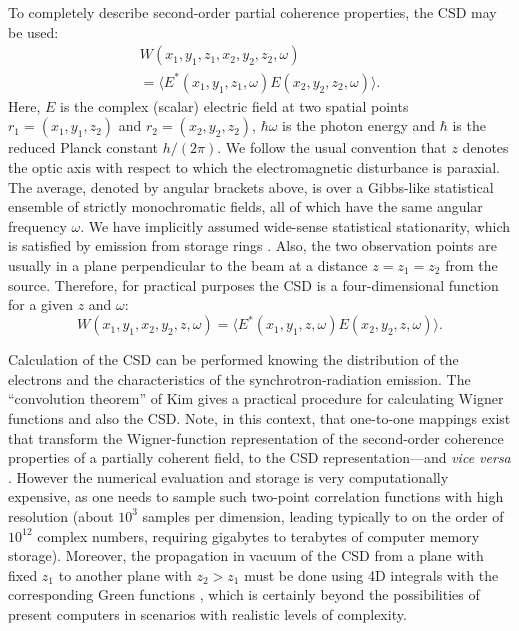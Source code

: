 \documentclass[%
 reprint,
 amsmath,amssymb,
 aps,
]{revtex4-1}
\begin{document}
To completely describe second-order partial coherence properties, the CSD \cite{Wolf1982,mandel_wolf} may be used: 
\begin{eqnarray}
\nonumber W(x_1,y_1,z_1,x_2,y_2,z_2,\omega) \quad\quad\quad\quad \\ = \langle E^{*}(x_1,y_1,z_1,\omega) E(x_2,y_2,z_2,\omega) \rangle.\label{eq:CSD}
\end{eqnarray}
Here, $E$ is the complex (scalar) electric field at two spatial points $r_1=(x_1,y_1,z_2)$ and $r_2=(x_2,y_2,z_2)$, $\hbar\omega$ is the photon energy and $\hbar$ is the reduced Planck constant $h/(2\pi)$.  We follow the usual convention that $z$ denotes the optic axis with respect to which the electromagnetic disturbance is paraxial. The average, denoted by angular brackets above, is over a Gibbs-like statistical ensemble of strictly monochromatic fields, all of which have the same angular frequency $\omega$. We have implicitly assumed wide-sense statistical stationarity, which is satisfied by emission from storage rings \cite{geloni}. Also, the two observation points are usually in a plane perpendicular to the beam at a distance $z=z_1=z_2$ from the source. Therefore, for practical purposes the CSD is a four-dimensional function for a given $z$ and $\omega$: 
\begin{equation}
W(x_1,y_1,x_2,y_2,z,\omega) = 
\langle E^{*}(x_1,y_1,z,\omega) E(x_2,y_2,z,\omega)\rangle.
\end{equation}

Calculation of the CSD can be performed knowing the distribution of the electrons and the characteristics of the synchrotron-radiation emission. The ``convolution theorem'' of Kim \cite{kim} gives a practical procedure for calculating Wigner functions \cite{Wigner1932} and also the CSD. Note, in this context, that one-to-one mappings exist that transform the Wigner-function representation of the second-order coherence properties of a partially coherent field, to the CSD representation---and {\em vice versa} \cite{AlonsoWignerFunctionReview}.  However the numerical evaluation and storage is very computationally expensive, as one needs to sample such two-point correlation functions with high resolution (about $10^3$ samples per dimension, leading typically to on the order of $10^{12}$ complex numbers, requiring gigabytes to terabytes of computer memory storage). Moreover, the propagation in vacuum of the CSD from a plane with fixed $z_1$ to another plane with $z_2>z_1$ must be done using 4D integrals with the corresponding Green functions \cite{mandel_wolf}, which is certainly beyond the possibilities of present computers in scenarios with realistic levels of complexity. 
\end{document}
